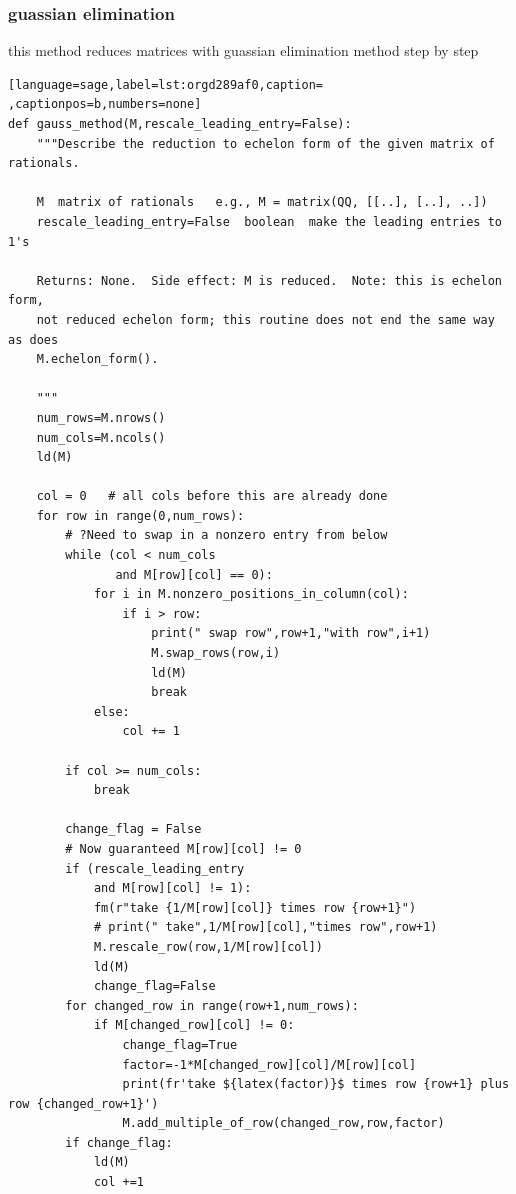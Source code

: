 \documentclass[a4paper,12pt]{article}
\begin{document}
\subsubsection{guassian elimination}
\label{sec:orga3f2f3b}
this method reduces matrices with guassian elimination method step by step\\[0pt]
\begin{lstlisting}[language=sage,label=lst:orgd289af0,caption= ,captionpos=b,numbers=none]
def gauss_method(M,rescale_leading_entry=False):
    """Describe the reduction to echelon form of the given matrix of rationals.

    M  matrix of rationals   e.g., M = matrix(QQ, [[..], [..], ..])
    rescale_leading_entry=False  boolean  make the leading entries to 1's

    Returns: None.  Side effect: M is reduced.  Note: this is echelon form, 
    not reduced echelon form; this routine does not end the same way as does 
    M.echelon_form().

    """
    num_rows=M.nrows()
    num_cols=M.ncols()
    ld(M)

    col = 0   # all cols before this are already done
    for row in range(0,num_rows): 
        # ?Need to swap in a nonzero entry from below
        while (col < num_cols
               and M[row][col] == 0): 
            for i in M.nonzero_positions_in_column(col):
                if i > row:
                    print(" swap row",row+1,"with row",i+1)
                    M.swap_rows(row,i)
                    ld(M)
                    break     
            else:
                col += 1

        if col >= num_cols:
            break

        change_flag = False
        # Now guaranteed M[row][col] != 0
        if (rescale_leading_entry
            and M[row][col] != 1):
            fm(r"take {1/M[row][col]} times row {row+1}")
            # print(" take",1/M[row][col],"times row",row+1)
            M.rescale_row(row,1/M[row][col])
            ld(M)
            change_flag=False
        for changed_row in range(row+1,num_rows):
            if M[changed_row][col] != 0:
                change_flag=True
                factor=-1*M[changed_row][col]/M[row][col]
                print(fr'take ${latex(factor)}$ times row {row+1} plus row {changed_row+1}')
                M.add_multiple_of_row(changed_row,row,factor)
        if change_flag:
            ld(M)
            col +=1
\end{lstlisting}
\end{document}
